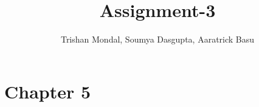 \documentclass[12pt]{article}
\title{Assignment-3}
\author{Trishan Mondal, Soumya Dasgupta, Aaratrick Basu}
\date{}
\begin{document}
 \maketitle
 \section*{Chapter 5}
\end{document}
